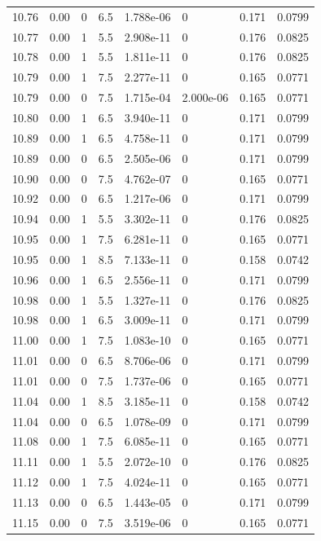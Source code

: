 \documentclass[preview]{standalone}
\begin{document}
{{{{{{{{{{{{\begin{tabular}{L{1.2cm}C{1.2cm} C{0.3cm}C{0.5cm} C{1.4cm}C{1.4cm} C{1.4cm}C{1.4cm}}
  10.76  &  0.00  & 0     & 6.5 &  1.788e-06  & 0  & 0.171 &  0.0799   \\ 
  10.77  &  0.00  & 1     & 5.5 &  2.908e-11  & 0  & 0.176 &  0.0825   \\ 
  10.78  &  0.00  & 1     & 5.5 &  1.811e-11  & 0  & 0.176 &  0.0825   \\ 
  10.79  &  0.00  & 1     & 7.5 &  2.277e-11  & 0  & 0.165 &  0.0771   \\ 
  10.79  &  0.00  & 0     & 7.5 &  1.715e-04  & 2.000e-06  & 0.165 &  0.0771   \\ 
  10.80  &  0.00  & 1     & 6.5 &  3.940e-11  & 0  & 0.171 &  0.0799   \\ 
  10.89  &  0.00  & 1     & 6.5 &  4.758e-11  & 0  & 0.171 &  0.0799   \\ 
  10.89  &  0.00  & 0     & 6.5 &  2.505e-06  & 0  & 0.171 &  0.0799   \\ 
  10.90  &  0.00  & 0     & 7.5 &  4.762e-07  & 0  & 0.165 &  0.0771   \\ 
  10.92  &  0.00  & 0     & 6.5 &  1.217e-06  & 0  & 0.171 &  0.0799   \\ 
  10.94  &  0.00  & 1     & 5.5 &  3.302e-11  & 0  & 0.176 &  0.0825   \\ 
  10.95  &  0.00  & 1     & 7.5 &  6.281e-11  & 0  & 0.165 &  0.0771   \\ 
  10.95  &  0.00  & 1     & 8.5 &  7.133e-11  & 0  & 0.158 &  0.0742   \\ 
  10.96  &  0.00  & 1     & 6.5 &  2.556e-11  & 0  & 0.171 &  0.0799   \\ 
  10.98  &  0.00  & 1     & 5.5 &  1.327e-11  & 0  & 0.176 &  0.0825   \\ 
  10.98  &  0.00  & 1     & 6.5 &  3.009e-11  & 0  & 0.171 &  0.0799   \\ 
  11.00  &  0.00  & 1     & 7.5 &  1.083e-10  & 0  & 0.165 &  0.0771   \\ 
  11.01  &  0.00  & 0     & 6.5 &  8.706e-06  & 0  & 0.171 &  0.0799   \\ 
  11.01  &  0.00  & 0     & 7.5 &  1.737e-06  & 0  & 0.165 &  0.0771   \\ 
  11.04  &  0.00  & 1     & 8.5 &  3.185e-11  & 0  & 0.158 &  0.0742   \\ 
  11.04  &  0.00  & 0     & 6.5 &  1.078e-09  & 0  & 0.171 &  0.0799   \\ 
  11.08  &  0.00  & 1     & 7.5 &  6.085e-11  & 0  & 0.165 &  0.0771   \\ 
  11.11  &  0.00  & 1     & 5.5 &  2.072e-10  & 0  & 0.176 &  0.0825   \\ 
  11.12  &  0.00  & 1     & 7.5 &  4.024e-11  & 0  & 0.165 &  0.0771   \\ 
  11.13  &  0.00  & 0     & 6.5 &  1.443e-05  & 0  & 0.171 &  0.0799   \\ 
  11.15  &  0.00  & 0     & 7.5 &  3.519e-06  & 0  & 0.165 &  0.0771   \\ 
\hline 
\end{tabular} 

}}}}}}}}}}}}
\end{document}
